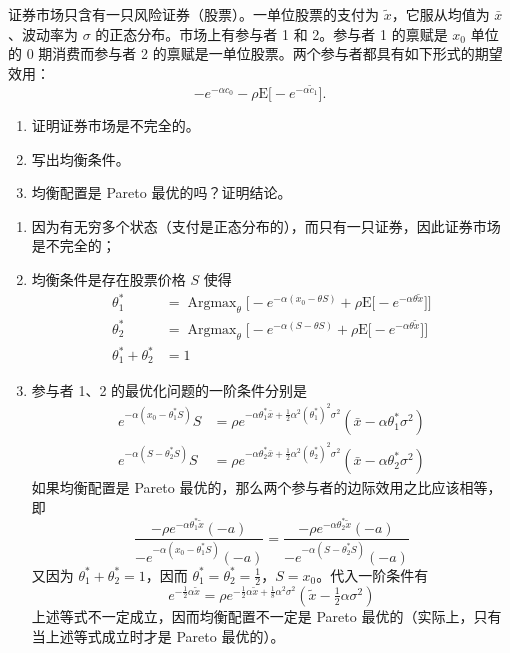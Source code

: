 \begin{problem}
 证券市场只含有一只风险证券（股票）。一单位股票的支付为 $\tilde{x}$，它服从均值为 $\bar{x}$、波动率为 $\sigma$ 的正态分布。市场上有参与者 1 和 2。参与者 1 的禀赋是 $x_{0}$ 单位的 0 期消费而参与者 2 的禀赋是一单位股票。两个参与者都具有如下形式的期望效用：
\[
    -e^{-\alpha c_{0}}-\rho\mathrm{E}\bigl[-e^{-\alpha\tilde{c}_{1}}\bigr].
\]
\begin{enumerate}[label=(\alph*)]
    \item 证明证券市场是不完全的。
    \item 写出均衡条件。
    \item 均衡配置是 Pareto 最优的吗？证明结论。
\end{enumerate}
\end{problem}
\begin{solution}
\begin{enumerate}[label=(\alph*)]
    \item 因为有无穷多个状态（支付是正态分布的），而只有一只证券，因此证券市场是不完全的；
    \item 均衡条件是存在股票价格 $S$ 使得
    \[
        \begin{aligned}
            \theta_{1}^{*}&=\operatorname{Argmax}_{\theta}\bigl[-e^{-\alpha(x_{0}-\theta S)}+\rho\mathrm{E}\bigl[-e^{-\alpha\theta\tilde{x}}\bigr]\bigr]\\
            \theta_{2}^{*}&=\operatorname{Argmax}_{\theta}\bigl[-e^{-\alpha(S-\theta S)}+\rho\mathrm{E}\bigl[-e^{-\alpha\theta\tilde{x}}\bigr]\bigr]\\
            \theta_{1}^{*}+\theta_{2}^{*}&=1
        \end{aligned}
    \]
    \item 参与者 1、2 的最优化问题的一阶条件分别是
    \[
        \begin{aligned}
            e^{-\alpha(x_{0}-\theta_{1}^{*}S)}S&=\rho e^{-\alpha\theta_{1}^{*}\bar{x}+\frac12\alpha^{2}(\theta_{1}^{*})^{2}\sigma^{2}}(\bar{x}-\alpha\theta_{1}^{*}\sigma^{2})\\
            e^{-\alpha(S-\theta_{2}^{*}S)}S&=\rho e^{-\alpha\theta_{2}^{*}\bar{x}+\frac12\alpha^{2}(\theta_{2}^{*})^{2}\sigma^{2}}(\bar{x}-\alpha\theta_{2}^{*}\sigma^{2})
        \end{aligned}
    \]
    如果均衡配置是 Pareto 最优的，那么两个参与者的边际效用之比应该相等，即
    \[
        \frac{-\rho e^{-\alpha\theta_{1}^{*}\tilde{x}}(-a)}{-e^{-\alpha(x_{0}-\theta_{1}^{*}S)}(-a)}=\frac{-\rho e^{-\alpha\theta_{2}^{*}\tilde{x}}(-a)}{-e^{-\alpha(S-\theta_{2}^{*}S)}(-a)}
    \]
    又因为 $\theta_{1}^{*}+\theta_{2}^{*}=1$，因而 $\theta_{1}^{*}=\theta_{2}^{*}=\tfrac12$，$S=x_{0}$。代入一阶条件有
    \[
        e^{-\frac12\alpha\tilde{x}}=\rho e^{-\frac12\alpha\tilde{x}+\frac18\alpha^{2}\sigma^{2}}(\tilde{x}-\tfrac12\alpha\sigma^{2})
    \]
    上述等式不一定成立，因而均衡配置不一定是 Pareto 最优的（实际上，只有当上述等式成立时才是 Pareto 最优的）。
\end{enumerate}
\end{solution}

